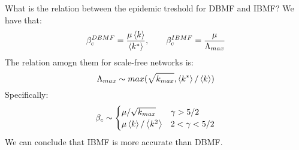 \documentclass[../main/main.tex]{subfiles}
\begin{document}
What is the relation between the epidemic treshold for DBMF and IBMF?
We have that:
\begin{equation*}
  \beta _c^{DBMF} = \frac{\mu \expval{k} }{\expval{k^*} }, \qquad \beta _c^{IBMF} = \frac{\mu }{\Lambda _{max}}
\end{equation*}
The relation amogn them for scale-free networks is:
\begin{equation*}
  \Lambda _{max} \sim max(\sqrt{k_{max}}, \expval{k^*}/\expval{k}   )
\end{equation*}
Specifically:
\begin{equation*}
\beta _c \sim
  \begin{cases}
   \mu / \sqrt{k_{max}} & \gamma > 5/2  \\
   \mu \expval{k}/\expval{k^2} & 2 < \gamma < 5/2
  \end{cases}
\end{equation*}
We can conclude that IBMF is more accurate than DBMF.
\end{document}
